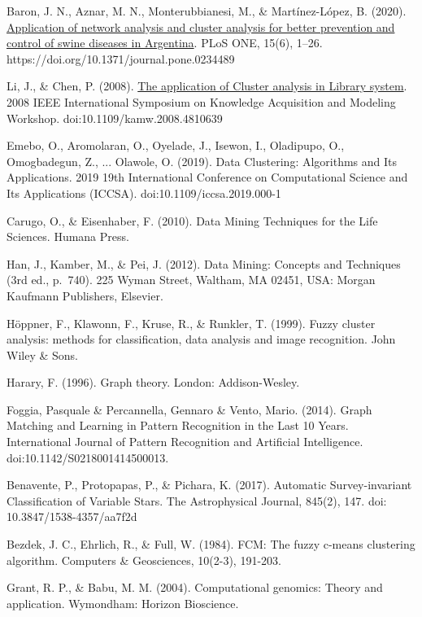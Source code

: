 \documentclass[10pt, a4paper]{article}
\begin{document}
\begin{thebibliography}{X}
 Baron, J. N., Aznar, M. N., Monterubbianesi, M., \& Martínez-López, B. (2020). \href{https://search.ebscohost.com/login.aspx?direct=true&db=aph&AN=143827917&lang=es&site=ehost-live&scope=site} {Application of network analysis and cluster analysis for better prevention and control of swine diseases in Argentina}. PLoS ONE, 15(6), 1–26. https://doi.org/10.1371/journal.pone.0234489

 Li, J., \& Chen, P. (2008). \href{https://ieeexplore.ieee.org/document/4810639} {The application of Cluster analysis in Library system}. 2008 IEEE International Symposium on Knowledge Acquisition and Modeling Workshop. doi:10.1109/kamw.2008.4810639

 Emebo, O., Aromolaran, O., Oyelade, J., Isewon, I., Oladipupo, O., Omogbadegun, Z., ... Olawole, O. (2019). Data Clustering: Algorithms and Its Applications. 2019 19th International Conference on Computational Science and Its Applications (ICCSA). doi:10.1109/iccsa.2019.000-1

 Carugo, O., \& Eisenhaber, F. (2010). Data Mining Techniques for the Life Sciences. Humana Press.

Han, J., Kamber, M., \& Pei, J. (2012). Data Mining: Concepts and Techniques (3rd ed., p.~740). 225 Wyman Street, Waltham, MA 02451, USA: Morgan Kaufmann Publishers, Elsevier.

 Höppner, F., Klawonn, F., Kruse, R., \& Runkler, T. (1999). Fuzzy cluster analysis: methods for classification, data analysis and image recognition. John Wiley \& Sons.

 Harary, F. (1996). Graph theory. London: Addison-Wesley.

 Foggia, Pasquale \& Percannella, Gennaro \& Vento, Mario. (2014). Graph Matching and Learning in Pattern Recognition in the Last 10 Years. International Journal of Pattern Recognition and Artificial Intelligence. doi:10.1142/S0218001414500013. 

 Benavente, P., Protopapas, P., \& Pichara, K. (2017). Automatic Survey-invariant Classification of Variable Stars. The Astrophysical Journal, 845(2), 147. doi: 10.3847/1538-4357/aa7f2d

 Bezdek, J. C., Ehrlich, R., \& Full, W. (1984). FCM: The fuzzy c-means clustering algorithm. Computers \& Geosciences, 10(2-3), 191-203.

 Grant, R. P., \& Babu, M. M. (2004). Computational genomics: Theory and application. Wymondham: Horizon Bioscience.


\end{thebibliography}
\end{document}
